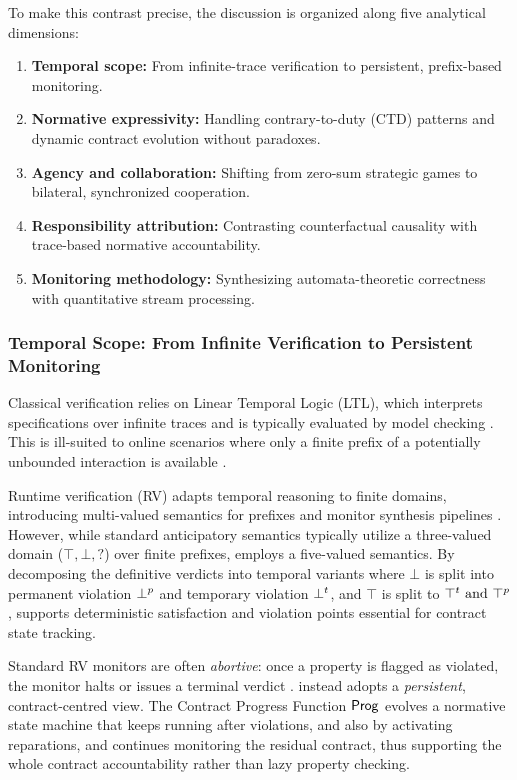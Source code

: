 To make this contrast precise, the discussion is organized along five analytical dimensions:
\begin{enumerate}
  \item \textbf{Temporal scope:} From infinite-trace verification to persistent, prefix-based monitoring.
  \item \textbf{Normative expressivity:} Handling contrary-to-duty (CTD) patterns and dynamic contract evolution without paradoxes.
  \item \textbf{Agency and collaboration:} Shifting from zero-sum strategic games to bilateral, synchronized cooperation.
  \item \textbf{Responsibility attribution:} Contrasting counterfactual causality with trace-based normative accountability.
  \item \textbf{Monitoring methodology:} Synthesizing automata-theoretic correctness with quantitative stream processing.
\end{enumerate}

\subsubsection{Temporal Scope: From Infinite Verification to Persistent Monitoring}
Classical verification relies on Linear Temporal Logic (LTL), which interprets specifications over infinite traces and is typically evaluated by model checking \cite{Pnueli1977}. This is ill-suited to online scenarios where only a finite prefix of a potentially unbounded interaction is available \cite{Bauer2011,de2013linear}.

Runtime verification (RV) adapts temporal reasoning to finite domains, introducing multi-valued semantics for prefixes and monitor synthesis pipelines \cite{leucker2011teaching,Bauer2011}. However, while standard anticipatory semantics typically utilize a three-valued domain ($\top, \bot, ?$) over finite prefixes, \cDL employs a five-valued semantics. By decomposing the definitive verdicts into temporal variants where $\bot$ is split into permanent violation $\bot^p$ and temporary violation $\bot^t$, and $\top$ is split to $\top^t \text{ and }\top^p$, \cDL supports deterministic satisfaction and violation points essential for contract state tracking.

Standard RV monitors are often \emph{abortive}: once a property is flagged as violated, the monitor halts or issues a terminal verdict \cite{leucker2011teaching,Bauer2011}. \cDL instead adopts a \emph{persistent}, contract-centred view. The Contract Progress Function $\mathsf{Prog}$ evolves a normative state machine that keeps running after violations, and also by activating reparations, and continues monitoring the residual contract, thus supporting the whole contract accountability rather than lazy property checking.

